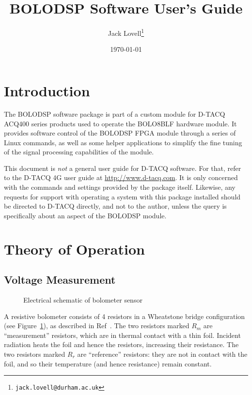 \documentclass[12pt,a4paper]{article}
\begin{document}
\title{BOLODSP Software User's Guide}

\author{Jack Lovell\thanks{\texttt{jack.lovell@durham.ac.uk}}}

\date{\today}

\maketitle


\tableofcontents

\section{Introduction}
The BOLODSP software package is part of a custom module for D-TACQ ACQ400 series products used to operate the BOLO8BLF hardware module. It provides
software control of the BOLODSP FPGA module through a series of Linux commands, as well as some helper applications to simplify the fine tuning of the
signal processing capabilities of the module.

This document is \textit{not} a general user guide for D-TACQ software. For that, refer to the D-TACQ 4G user guide at \mbox{\url{http://www.d-tacq.com}}.
It is only concerned with the commands and settings provided by the package itself. Likewise, any requests for support with operating a system with this
package installed should be directed to D-TACQ directly, and not to the author, unless the query is specifically about an aspect of the BOLODSP module.

\section{Theory of Operation}
\subsection{Voltage Measurement}
\label{sec:voltage}
\begin{figure}
  \centering
  \def\svgwidth{0.3\columnwidth}
  
  \caption{Electrical schematic of bolometer sensor\label{fig:sensor}}
\end{figure}
A resistive bolometer consists of 4 resistors in a Wheatstone bridge configuration (see Figure~\ref{fig:sensor}), as described in Ref~\cite{mast-1991}.
The two resistors marked $R_m$ are ``measurement'' resistors, which are in thermal contact with a thin foil. Incident radiation heats the foil and hence
the resistors, increasing their resistance. The two resistors marked $R_r$ are ``reference'' resistors: they are not in contact with the foil, and so their
temperature (and hence resistance) remain constant.
\end{document}

